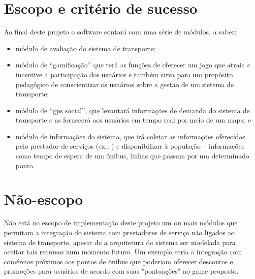 \section{Escopo e critério de sucesso}\label{sec:Escopo}
	Ao final deste projeto o software contará com uma série de módulos, a saber:
	\begin{itemize}%
		\item módulo de avaliação do sistema de transporte;
		\item módulo de “gamificação” que terá as funções de oferecer um jogo que atraia e incentive a participação dos usuários e também sirva para um propósito pedagógico de conscientizar os usuários sobre a gestão de um sistema de transporte;
		\item módulo de “gps social”, que levantará informações de demanda do sistema de transporte e as fornecerá aos usuários em tempo real por meio de um mapa; e
		\item módulo de informações do sistema, que irá coletar as informações oferecidas pelo prestador de serviços (ex.: \sptrans) e disponibilizar à população – informações como tempo de espera de um ônibus, linhas que passam por um determinado ponto.
	\end{itemize}

\section{Não-escopo}\label{sec:NãoEscopo}
	Não está no escopo de implementação deste projeto um ou mais módulos que permitam a integração do sistema com prestadores de serviço não ligados ao sistema de transporte, apesar de a arquitetura do sistema ser modelada para aceitar tais recursos num momento futuro. Um exemplo seria a integração com comércios próximos aos pontos de ônibus que poderiam oferecer descontos e promoções para usuários de acordo com suas "pontuações" no game proposto.

